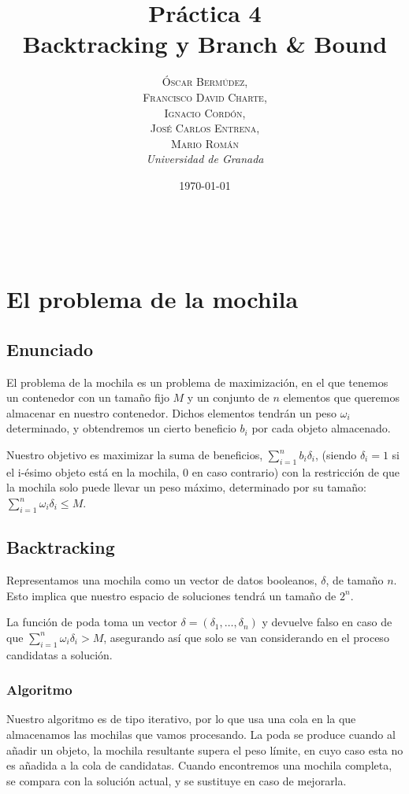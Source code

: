 \documentclass[a4paper, 11pt]{article} %
\title{\textbf{Práctica 4}\\ %
Backtracking y Branch \& Bound} %
\author{\textsc{Óscar Bermúdez,\\Francisco David Charte,\\Ignacio Cordón,\\José Carlos Entrena,\\Mario Román} %
\\{\textit{Universidad de Granada}}} %
\date{\today} %
\makeatletter
\renewcommand{\maketitle}{ %
\begin{flushright} %
{\LARGE\@title} %

\vspace{50pt} %

{\large\@author} %
\\\@date %

\vspace{40pt} %
\end{flushright}
}
\makeatother
\begin{document}
\maketitle %

\renewcommand{\abstractname}{Resumen} %
\begin{abstract}
\end{abstract}
{\parskip=2pt
\tableofcontents
}
\pagebreak


\section{El problema de la mochila}

\subsection{Enunciado}
El problema de la mochila es un problema de maximización, en el que tenemos un contenedor con un tamaño 
fijo $M$ y un conjunto de $n$ elementos que queremos almacenar en nuestro contenedor. Dichos elementos tendrán un peso $\omega_i$
determinado, y obtendremos un cierto beneficio $b_i$ por cada objeto almacenado.

Nuestro objetivo es maximizar la suma de beneficios, $\sum_{i=1}^{n} b_i\delta_i$, (siendo $\delta_i = 1$ si el i-ésimo objeto está en la mochila, 0 en caso contrario) con la restricción de que la mochila solo puede llevar un peso máximo, determinado por su tamaño: $\sum_{i=1}^{n} \omega_i\delta_i \leq M$.

  
    \subsection{Backtracking}
Representamos una mochila como un vector de datos booleanos, $\delta$, de tamaño $n$. Esto implica que nuestro espacio de soluciones tendrá un tamaño de $2^n$.

La función de poda toma un vector $\delta = (\delta_1, \dots, \delta_n)$ y devuelve falso en caso de que $\sum_{i=1}^{n} \omega_i\delta_i > M$, asegurando así que solo se van considerando en el proceso candidatas a solución.

	\newpage

	\subsubsection{Algoritmo}
Nuestro algoritmo es de tipo iterativo, por lo que usa una cola en la que almacenamos las mochilas que vamos procesando. La poda se produce cuando al añadir un objeto, la mochila resultante supera el peso límite, en cuyo caso esta no es añadida a la cola de candidatas. Cuando encontremos una mochila completa, se compara con la solución actual, y se sustituye en caso de mejorarla. 
\end{document}
